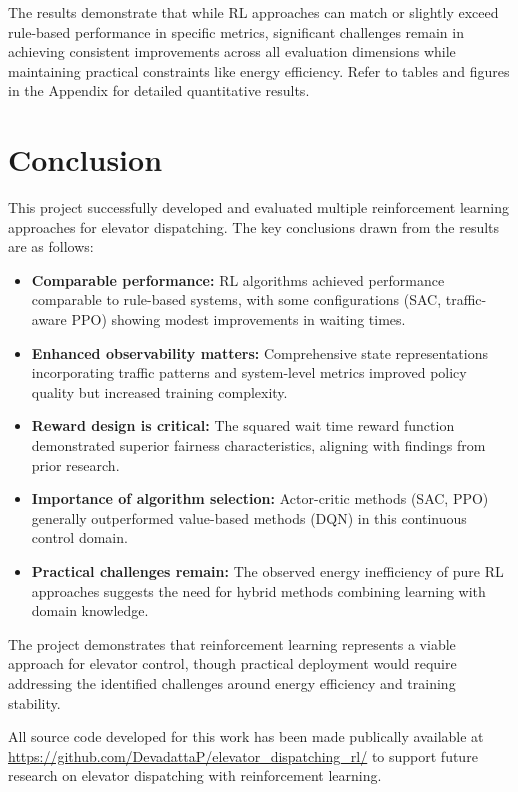 \documentclass[10pt,twocolumn]{article}
\begin{document}
The results demonstrate that while RL approaches can match or slightly exceed rule-based performance in specific metrics, significant challenges remain in achieving consistent improvements across all evaluation dimensions while maintaining practical constraints like energy efficiency. Refer to tables and figures in the Appendix for detailed quantitative results.

\section{Conclusion}
This project successfully developed and evaluated multiple reinforcement learning approaches for elevator dispatching. The key conclusions drawn from the results are as follows:

\begin{itemize}
    \item \textbf{Comparable performance:} RL algorithms achieved performance comparable to rule-based systems, with some configurations (SAC, traffic-aware PPO) showing modest improvements in waiting times.

    \item \textbf{Enhanced observability matters:} Comprehensive state representations incorporating traffic patterns and system-level metrics improved policy quality but increased training complexity.

    \item \textbf{Reward design is critical:} The squared wait time reward function demonstrated superior fairness characteristics, aligning with findings from prior research.

    \item \textbf{Importance of algorithm selection:} Actor-critic methods (SAC, PPO) generally outperformed value-based methods (DQN) in this continuous control domain.

    \item \textbf{Practical challenges remain:} The observed energy inefficiency of pure RL approaches suggests the need for hybrid methods combining learning with domain knowledge.
\end{itemize}

The project demonstrates that reinforcement learning represents a viable approach for elevator control, though practical deployment would require addressing the identified challenges around energy efficiency and training stability.

All source code developed for this work has been made publically available at
\url{https://github.com/DevadattaP/elevator_dispatching_rl/} to support future research on elevator dispatching with reinforcement learning.
\end{document}
